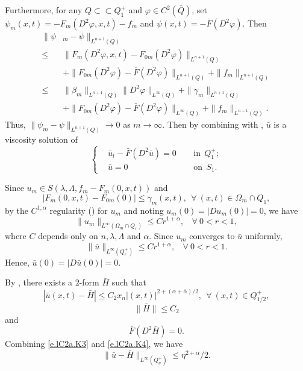 \documentclass[preprint,12pt]{elsarticle}
\theoremstyle{definition}
\theoremstyle{remark}
\numberwithin{equation}{section}
\begin{document}
Furthermore, for any $Q\subset\subset Q_1^+$ and $\varphi\in C^2(\bar{Q})$, set $\psi_m(x,t)=-F_m(D^2\varphi,x,t)-f_m$ and $\psi(x,t)=-\bar F(D^2\varphi)$. Then
\begin{equation*}
  \begin{aligned}
\|\psi&_m-\psi\|_{L^{n+1}(Q)}\\
\leq& \|F_m(D^2\varphi,x,t)-F_{0m}(D^2\varphi)\|_{L^{n+1}(Q)}\\
    &+\|F_{0m}(D^2\varphi)-\bar F(D^2\varphi)\|_{L^{n+1}(Q)}+\|f_m\|_{L^{n+1}(Q)}\\
\leq& \|\beta_{m}\|_{L^{n+1}(Q)}\|D^2\varphi\|_{L^{\infty}(Q)}
    +\|\gamma_{m}\|_{L^{n+1}(Q)}\\
    &+\|F_{0m}(D^2\varphi)-\bar F(D^2\varphi)\|_{L^{\infty}(Q)}+\|f_m\|_{L^{n+1}(Q)}.
\end{aligned}
\end{equation*}
Thus, $\|\psi_m-\psi\|_{L^{n+1}(Q)}\rightarrow 0$ as $m\rightarrow \infty$. Then by combining  with , $\bar u$ is a viscosity solution of
\begin{equation*}
\left\{\begin{aligned}
&\bar u_t-\bar F(D^2\bar u)=0&& ~~\mbox{in}~~Q_{1}^+;\\
&\bar u=0&& ~~\mbox{on}~~S_{1}.
\end{aligned}\right.
\end{equation*}

Since $u_m\in S(\lambda,\Lambda,f_m-F_m(0,x,t))$ and
\begin{equation*}
|F_m(0,x,t)-F_{0m}(0)|\leq \gamma_m(x,t),~~\forall ~(x,t)\in \Omega_m\cap Q_1,
\end{equation*}
by the $C^{1,\alpha}$ regularity () for $u_m$ and noting $u_m(0)=|Du_m(0)|=0$, we have
\begin{equation*}
\|u_m\|_{L^{\infty }(\Omega_m\cap Q_r)}\leq Cr^{1+\alpha}, ~~~~\forall~0<r<1,
\end{equation*}
where $C$ depends only on $n,\lambda,\Lambda$ and $\alpha$. Since $u_m$ converges to $\bar u$ uniformly,
\begin{equation*}
\|\bar u\|_{L^{\infty }(Q_r^+)}\leq Cr^{1+\alpha}, ~~~~\forall~0<r<1.
\end{equation*}
Hence, $\bar u(0)=|D\bar u(0)|=0$.

By , there exists a $2$-form $\bar{H}$ such that
\begin{equation}\label{e.lC2a.K4}
  |\bar u(x,t)-\bar H|\leq C_2 x_n|(x,t)|^{2+(\alpha+\bar{\alpha})/2}, ~~\forall ~(x,t)\in Q_{1/2}^+,
\end{equation}
\begin{equation*}
\|\bar H\|\leq C_2
\end{equation*}
and
\begin{equation*}
  \bar F(D^2 \bar H)=0.
\end{equation*}
Combining \cref{e.lC2a.K3} and \cref{e.lC2a.K4}, we have
\begin{equation}\label{e.lC2a.K5}
  \|\bar u-\bar H\|_{L^{\infty}(Q_{\eta}^+)}\leq \eta^{2+\alpha}/2.
\end{equation}
\end{document}
